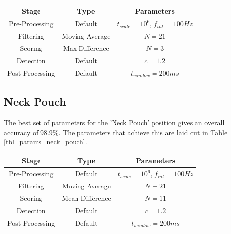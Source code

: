                 \begin{center}
                    \label{tbl_params_arm_band}
                    \begin{tabular}{|c|c|c|}
                        \hline
                        Stage & Type & Parameters \\
                        \hline
                        Pre-Processing & Default & $t_{scale}=10^6$, $f_{int}=100Hz$ \\
                        Filtering & Moving Average & $N=21$ \\
                        Scoring & Max Difference & $N=3$ \\
                        Detection & Default & $c=1.2$ \\
                        Post-Processing & Default & $t_{window}=200ms$ \\
                        \hline
                    \end{tabular}
                \end{center}

            \subsection{Neck Pouch}

                The best set of parameters for the 'Neck Pouch' position gives an overall accuracy of 98.9\%. The parameters that achieve this are laid out in Table \ref{tbl_params_neck_pouch}.

                \begin{center}
                    \label{tbl_params_neck_pouch}
                    \begin{tabular}{|c|c|c|}
                        \hline
                        Stage & Type & Parameters \\
                        \hline
                        Pre-Processing & Default & $t_{scale}=10^6$, $f_{int}=100Hz$ \\
                        Filtering & Moving Average & $N=21$ \\
                        Scoring & Mean Difference & $N=11$ \\
                        Detection & Default & $c=1.2$ \\
                        Post-Processing & Default & $t_{window}=200ms$ \\
                        \hline
                    \end{tabular}
                \end{center}

